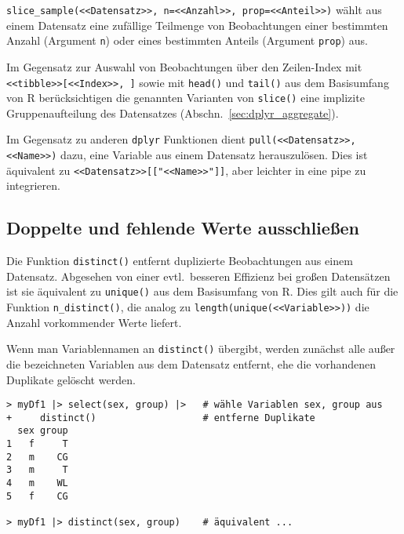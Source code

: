 \lstinline!slice_sample(<<Datensatz>>, n=<<Anzahl>>, prop=<<Anteil>>)! wählt aus einem Datensatz eine zufällige Teilmenge von Beobachtungen einer bestimmten Anzahl (Argument \lstinline!n!) oder eines bestimmten Anteils (Argument \lstinline!prop!) aus.

Im Gegensatz zur Auswahl von Beobachtungen über den Zeilen-Index mit \lstinline!<<tibble>>[<<Index>>, ]! sowie mit \lstinline!head()! und \lstinline!tail()! aus dem Basisumfang von R berücksichtigen die genannten Varianten von \lstinline!slice()! eine implizite Gruppenaufteilung des Datensatzes (Abschn.\ \ref{sec:dplyr_aggregate}).

Im Gegensatz zu anderen \lstinline!dplyr! Funktionen dient \lstinline!pull(<<Datensatz>>, <<Name>>)! dazu, eine Variable aus einem Datensatz herauszulösen. Dies ist äquivalent zu \lstinline!<<Datensatz>>[["<<Name>>"]]!, aber leichter in eine pipe zu integrieren.

\subsection{Doppelte und fehlende Werte ausschließen}
\label{sec:dplyr_naDf}

Die Funktion \lstinline!distinct()! entfernt duplizierte Beobachtungen aus einem Datensatz. Abgesehen von einer evtl.\ besseren Effizienz bei großen Datensätzen ist sie äquivalent zu \lstinline!unique()! aus dem Basisumfang von R. Dies gilt auch für die Funktion \lstinline!n_distinct()!, die analog zu \lstinline!length(unique(<<Variable>>))! die Anzahl vorkommender Werte liefert.

Wenn man Variablennamen an \lstinline!distinct()! übergibt, werden zunächst alle außer die bezeichneten Variablen aus dem Datensatz entfernt, ehe die vorhandenen Duplikate gelöscht werden. 
\begin{lstlisting}
> myDf1 |> select(sex, group) |>   # wähle Variablen sex, group aus
+     distinct()                   # entferne Duplikate
  sex group
1   f     T
2   m    CG
3   m     T
4   m    WL
5   f    CG

> myDf1 |> distinct(sex, group)    # äquivalent ...
\end{lstlisting}

